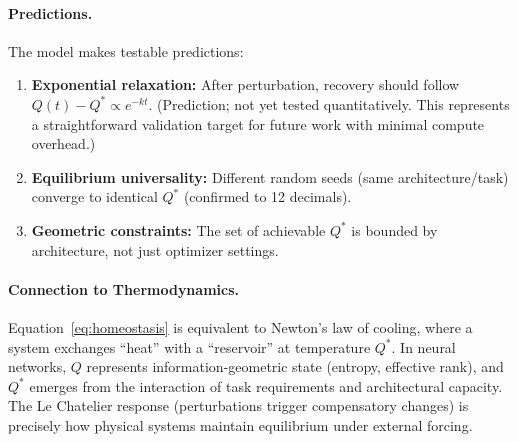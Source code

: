 \paragraph{Predictions.}
The model makes testable predictions:
\begin{enumerate}
    \item \textbf{Exponential relaxation:} After perturbation, recovery should follow $Q(t) - Q^* \propto e^{-kt}$. (Prediction; not yet tested quantitatively. This represents a straightforward validation target for future work with minimal compute overhead.)
    \item \textbf{Equilibrium universality:} Different random seeds (same architecture/task) converge to identical $Q^*$ (confirmed to 12 decimals).
    \item \textbf{Geometric constraints:} The set of achievable $Q^*$ is bounded by architecture, not just optimizer settings.
\end{enumerate}

\paragraph{Connection to Thermodynamics.}
Equation~\ref{eq:homeostasis} is equivalent to Newton's law of cooling, where a system exchanges ``heat'' with a ``reservoir'' at temperature $Q^*$. In neural networks, $Q$ represents information-geometric state (entropy, effective rank), and $Q^*$ emerges from the interaction of task requirements and architectural capacity. The Le Chatelier response (perturbations trigger compensatory changes) is precisely how physical systems maintain equilibrium under external forcing.
